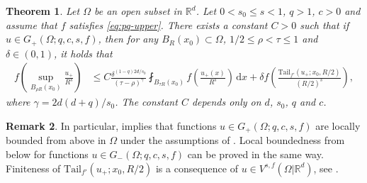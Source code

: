 \documentclass[11pt]{amsart}
\theoremstyle{plain}
\newtheorem{theorem}{Theorem}[section]
\theoremstyle{definition}
\newtheorem{remark}[theorem]{Remark}
\numberwithin{equation}{section}
\newcommand{\dx} {\,\mathrm{d}x}
\newcommand{\R}{\mathbb{R}}
\newcommand{\Rd}{\mathbb{R}^d}
\begin{document}
\begin{theorem}
\label{thm:locbdd}
Let $\Omega$ be an open subset in $\Rd$. Let $0 < s_0 \leq s < 1$, $q > 1$, $c > 0$ and assume that $f$ satisfies \eqref{eq:pq-upper}. There exists a constant $C > 0$ such that if $u \in G_+(\Omega; q, c, s, f)$, then for any $B_R(x_0) \subset \Omega$, $1/2 \le \rho < \tau \leq 1$ and $\delta \in (0,1)$, it holds that
\begin{equation*}
\begin{split}
f\left( \sup_{B_{\rho R}(x_0)} \frac{u_+}{R^s} \right)
&\leq C \frac{\delta^{(1-q)2d/s_0}}{(\tau-\rho)^{\gamma}} \fint_{B_{\tau R}(x_0)} f\left( \frac{u_+(x)}{R^s} \right) \dx + \delta f \left( \frac{\mathrm{Tail}_{f'}(u_+;x_0,R/2)}{(R/2)^s} \right),
\end{split}
\end{equation*}
where $\gamma = 2d(d+q)/s_0$. The constant $C$ depends only on $d$, $s_0$, $q$ and $c$.
\end{theorem}

\begin{remark}
In particular,  implies that functions $u \in G_+(\Omega; q, c, s, f)$ are locally bounded from above in $\Omega$ under the assumptions of . Local boundedness from below for functions $u \in G_-(\Omega; q, c, s, f)$ can be proved in the same way. Finiteness of $\mathrm{Tail}_{f'}(u_+;x_0,R/2)$ is a consequence of $u \in V^{s,f}(\Omega|\R^d)$, see \cite[Proposition 3.2]{ChKiWe21}.
\end{remark}
\end{document}
